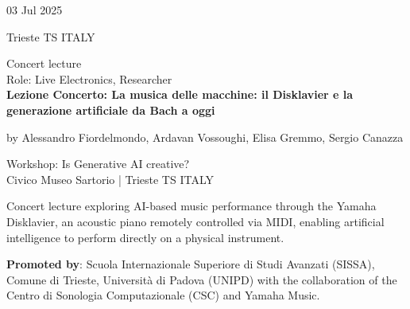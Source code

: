 \documentclass[7pt,a4paper]{article}
\begin{document}
\begin{mdframed}[
    backgroundcolor=white,
    linecolor=white,
    linewidth=0pt,
    innerleftmargin=6pt,
    innerrightmargin=6pt,
    innertopmargin=6pt,
    innerbottommargin=6pt,
    skipabove=0pt,
    skipbelow=0pt
]

\begin{minipage}[t]{0.28\textwidth}

03 Jul 2025

\scriptsize Trieste TS ITALY


\end{minipage}
\begin{minipage}[t]{0.68\textwidth}
\small Concert lecture
\\\scriptsize Role: Live Electronics, Researcher
\\ \normalsize \textbf{Lezione Concerto: La musica delle macchine: il Disklavier e la generazione artificiale da Bach a oggi}
\par\scriptsize by Alessandro Fiordelmondo, Ardavan Vossoughi, Elisa Gremmo, Sergio Canazza

\vspace{0.25cm}



\small Workshop: Is Generative AI creative?\\Civico Museo Sartorio | \scriptsize Trieste TS ITALY

\vspace{0.1cm}
\scriptsize

Concert lecture exploring AI-based music performance through the Yamaha Disklavier, an acoustic piano remotely controlled via MIDI, enabling artificial intelligence to perform directly on a physical instrument.

\vspace{0.1cm}
\par \textbf{Promoted by}: Scuola Internazionale Superiore di Studi Avanzati (SISSA), Comune di Trieste, Università di Padova (UNIPD) with the collaboration of the Centro di Sonologia Computazionale (CSC) and Yamaha Music.
\end{minipage}
\vspace{0.25cm}
\end{mdframed}
\end{document}
